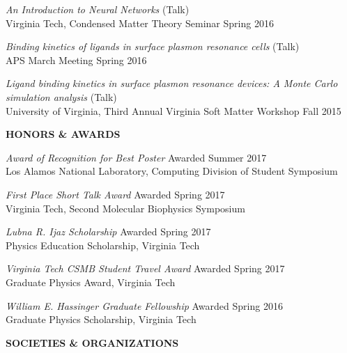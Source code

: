 \documentclass[10pt]{letter}
\begin{document}
{\sl An Introduction to Neural Networks} (Talk)\\ 
Virginia Tech, Condensed Matter Theory Seminar \hfill Spring 2016 

{\sl Binding kinetics of ligands in surface plasmon resonance cells} (Talk) \\ 
 APS March Meeting \hfill Spring 2016

{\sl Ligand binding kinetics in surface plasmon resonance devices: A Monte Carlo simulation analysis} (Talk)\\
University of Virginia, Third Annual Virginia Soft Matter Workshop \hfill Fall 2015


\vspace{.5cm}




{\bf HONORS \& AWARDS}

{\it Award of Recognition for Best Poster} \hfill Awarded Summer 2017\\
 Los Alamos National Laboratory, Computing Division of Student Symposium
 
{\it First Place Short Talk Award} \hfill Awarded Spring 2017\\
 Virginia Tech, Second Molecular Biophysics Symposium

{\it Lubna R. Ijaz Scholarship} \hfill Awarded Spring 2017\\
 Physics Education Scholarship, Virginia Tech 

{\it Virginia Tech CSMB Student Travel Award} \hfill Awarded Spring 2017\\
 Graduate Physics Award, Virginia Tech

{\it William E. Hassinger Graduate Fellowship} \hfill Awarded Spring 2016\\
 Graduate Physics Scholarship, Virginia Tech


\vspace{.5cm}


{\bf SOCIETIES \& ORGANIZATIONS} 

\end{document}
